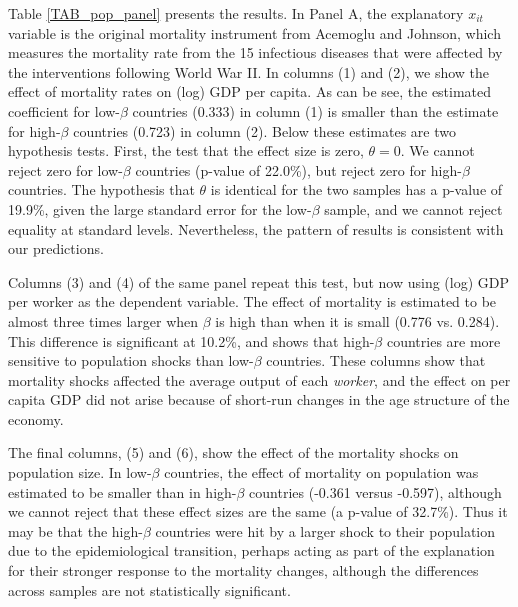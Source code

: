 \documentclass[11pt]{article}
\begin{document}
Table \ref{TAB_pop_panel} presents the results. In Panel A, the explanatory $x_{it}$ variable is the original mortality instrument from Acemoglu and Johnson, which measures the mortality rate from the 15 infectious diseases that were affected by the interventions following World War II. In columns (1) and (2), we show the effect of mortality rates on (log) GDP per capita. As can be see, the estimated coefficient for low-$\beta$ countries (0.333) in column (1) is smaller than the estimate for high-$\beta$ countries (0.723) in column (2). Below these estimates are two hypothesis tests. First, the test that the effect size is zero, $\theta=0$. We cannot reject zero for low-$\beta$ countries (p-value of 22.0\%), but reject zero for high-$\beta$ countries. The hypothesis that $\theta$ is identical for the two samples has a p-value of 19.9\%, given the large standard error for the low-$\beta$ sample, and we cannot reject equality at standard levels. Nevertheless, the pattern of results is consistent with our predictions.

Columns (3) and (4) of the same panel repeat this test, but now using (log) GDP per worker as the dependent variable. The effect of mortality is estimated to be almost three times larger when $\beta$ is high than when it is small (0.776 vs. 0.284). This difference is significant at 10.2\%, and shows that high-$\beta$ countries are more sensitive to population shocks than low-$\beta$ countries. These columns show that mortality shocks affected the average output of each \textit{worker}, and the effect on per capita GDP did not arise because of short-run changes in the age structure of the economy.

The final columns, (5) and (6), show the effect of the mortality shocks on population size. In low-$\beta$ countries, the effect of mortality on population was estimated to be smaller than in high-$\beta$ countries (-0.361 versus -0.597), although we cannot reject that these effect sizes are the same (a p-value of 32.7\%). Thus it may be that the high-$\beta$ countries were hit by a larger shock to their population due to the epidemiological transition, perhaps acting as part of the explanation for their stronger response to the mortality changes, although the differences across samples are not statistically significant.
\end{document}
